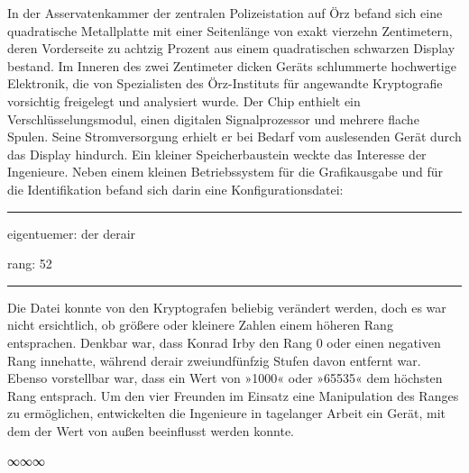 In der Asservatenkammer der zentralen Polizeistation auf Örz befand sich eine quadratische Metallplatte mit einer Seitenlänge von exakt vierzehn Zentimetern, deren Vorderseite zu achtzig Prozent aus einem quadratischen schwarzen Display bestand. Im Inneren des zwei Zentimeter dicken Geräts schlummerte hochwertige Elektronik, die von Spezialisten des Örz-Instituts für angewandte Kryptografie vorsichtig freigelegt und analysiert wurde. Der Chip enthielt ein Verschlüsselungsmodul, einen digitalen Signalprozessor und mehrere flache Spulen. Seine Stromversorgung erhielt er bei Bedarf vom auslesenden Gerät durch das Display hindurch. Ein kleiner Speicherbaustein weckte das Interesse der Ingenieure. Neben einem kleinen Betriebssystem für die Grafikausgabe und für die Identifikation befand sich darin eine Konfigurationsdatei:

\noindent \parbox{\textwidth}{ \vspace{3ex} \hrule \vspace{3ex}

    \begin{tiny}
    \begin{ttfamily}

\noindent eigentuemer: der derair

\noindent rang: 52

    \end{ttfamily}
    \end{tiny}

\vspace{3ex} \hrule \vspace{3ex} }

Die Datei konnte von den Kryptografen beliebig verändert werden, doch es war nicht ersichtlich, ob größere oder kleinere Zahlen einem höheren Rang entsprachen. Denkbar war, dass Konrad Irby den Rang 0 oder einen negativen Rang innehatte, während derair zweiundfünfzig Stufen davon entfernt war. Ebenso vorstellbar war, dass ein Wert von »1000« oder »65535« dem höchsten Rang entsprach. Um den vier Freunden im Einsatz eine Manipulation des Ranges zu ermöglichen, entwickelten die Ingenieure in tagelanger Arbeit ein Gerät, mit dem der Wert von außen beeinflusst werden konnte.

\begin{center}
∞∞∞
\end{center}

